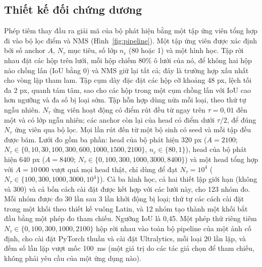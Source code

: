 \documentclass[12pt,a4paper]{article}
\newcommand{\Ntau}{N_{\tau}}
\begin{document}
\subsection{Thiết kế đối chứng dương}
Phép tiêm thay đầu ra giải mã của bộ phát hiện bằng một tập ứng viên tổng hợp đi vào bộ lọc điểm và NMS (Hình~\ref{fig:pipeline}). Một tập ứng viên được xác định bởi số anchor $A$, $\Ntau$ mục tiêu, số lớp $n_c$ (80 hoặc 1) và một hình học. Tập rời nhau đặt các hộp trên lưới, mỗi hộp chiếm 80\% ô lưới của nó, để không hai hộp nào chồng lấn (IoU bằng 0) và NMS giữ lại tất cả; đây là trường hợp xấu nhất cho vòng lặp tham lam. Tập cụm dày đặc đặt các hộp cỡ khoảng 48 px, lệch tối đa 2 px, quanh tám tâm, sao cho các hộp trong một cụm chồng lấn với IoU cao hơn ngưỡng và đa số bị loại sớm. Tập hỗn hợp dùng nửa mỗi loại, theo thứ tự ngẫu nhiên. $\Ntau$ ứng viên hoạt động có điểm rút đều từ ngay trên $\tau=0{,}01$ đến một và có lớp ngẫu nhiên; các anchor còn lại của head có điểm dưới $\tau/2$, để đúng $\Ntau$ ứng viên qua bộ lọc. Mọi lần rút đến từ một bộ sinh có seed và mỗi tập đều được băm. Lưới đo gồm ba phần: head của bộ phát hiện 320 px ($A=2100$; $\Ntau\in\{0,10,30,100,300,600,1000,1500,2100\}$, $n_c\in\{80,1\}$), head của bộ phát hiện 640 px ($A=8400$; $\Ntau\in\{0,100,300,1000,3000,8400\}$) và một head tổng hợp với $A=10\,000$ vượt quá mọi head thật, chỉ dùng để đạt $\Ntau=10^4$ ($\Ntau\in\{100,300,1000,3000,10^4\}$). Cả ba hình học, cả hai thiết lập giới hạn (không và 300) và cả bốn cách cài đặt được kết hợp với các lưới này, cho 123 nhóm đo. Mỗi nhóm được đo 30 lần sau 3 lần khởi động bị loại; thứ tự các cách cài đặt trong một khối theo thiết kế vuông Latin, và 12 nhóm tạo thành một khối bắt đầu bằng một phép đo tham chiếu. Ngưỡng IoU là 0,45. Một phép thử riêng tiêm $\Ntau\in\{0,100,300,1000,2100\}$ hộp rời nhau vào toàn bộ pipeline của một ảnh cố định, cho cài đặt PyTorch thuần và cài đặt Ultralytics, mỗi loại 20 lần lặp, và đếm số lần lặp vượt mốc 100~ms (một giá trị do các tác giả chọn để tham chiếu, không phải yêu cầu của một ứng dụng nào).
\end{document}
